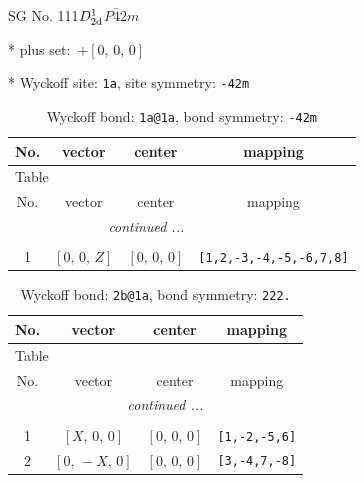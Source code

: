 \documentclass[fleqn,8pt]{jsarticle}
\begin{document}
\setcounter{MaxMatrixCols}{32}

\renewcommand{\tablename}{Table~}
\renewcommand{\figurename}{Figure~}
\begin{center}
\LARGE
SG No. 111\quad$D_{\rm 2d}^{1}$\quad$P\bar{4}2m$\quad[ tetragonal ]
\end{center}

* plus set:\,\,\,$+\left[ 0,\, 0,\, 0 \right]$


* Wyckoff site: {\tt 1a}, site symmetry: {\tt -42m}
\renewcommand{\arraystretch}{1.2}
\begin{longtable}{cccc}
\caption{Wyckoff bond: {\tt 1a@1a}, bond symmetry: {\tt -42m}}
 \\
 \hline \hline
No. & vector & center & mapping \\ \hline \endfirsthead

\multicolumn{3}{l}{\tablename\ \thetable{}} \\
 \hline \hline
No. & vector & center & mapping \\ \hline \endhead

 \hline \hline
\multicolumn{3}{r}{\footnotesize\it continued ...} \\ \endfoot

 \hline \hline
\multicolumn{3}{r}{} \\ \endlastfoot

1 & $\left[ 0,\, 0,\, Z \right]$ & $\left[ 0,\, 0,\, 0 \right]$ & {\tt [1,2,-3,-4,-5,-6,7,8]} \\
\end{longtable}
\renewcommand{\arraystretch}{1.2}
\begin{longtable}{cccc}
\caption{Wyckoff bond: {\tt 2b@1a}, bond symmetry: {\tt 222.}}
 \\
 \hline \hline
No. & vector & center & mapping \\ \hline \endfirsthead

\multicolumn{3}{l}{\tablename\ \thetable{}} \\
 \hline \hline
No. & vector & center & mapping \\ \hline \endhead

 \hline \hline
\multicolumn{3}{r}{\footnotesize\it continued ...} \\ \endfoot

 \hline \hline
\multicolumn{3}{r}{} \\ \endlastfoot

1 & $\left[ X,\, 0,\, 0 \right]$ & $\left[ 0,\, 0,\, 0 \right]$ & {\tt [1,-2,-5,6]} \\ \hline
2 & $\left[ 0,\, - X,\, 0 \right]$ & $\left[ 0,\, 0,\, 0 \right]$ & {\tt [3,-4,7,-8]} \\
\end{longtable}
\end{document}
